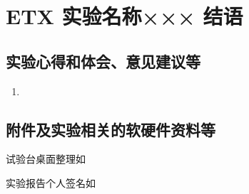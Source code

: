 \documentclass[dvipsnames, svgnames,a4paper,11pt]{article}
\begin{document}
	\begin{question}
		
	\end{question}
	
	\begin{question}
		
	\end{question}
	
	
	
	\clearpage
	
	\section{ETX 实验名称××× \quad\heiti 结语}
	
	\subsection{实验心得和体会、意见建议等}
	\begin{enumerate}
		\item 
	\end{enumerate}
	

	\subsection{附件及实验相关的软硬件资料等}
	试验台桌面整理如%
	
	实验报告个人签名如

	
	
\end{document}
